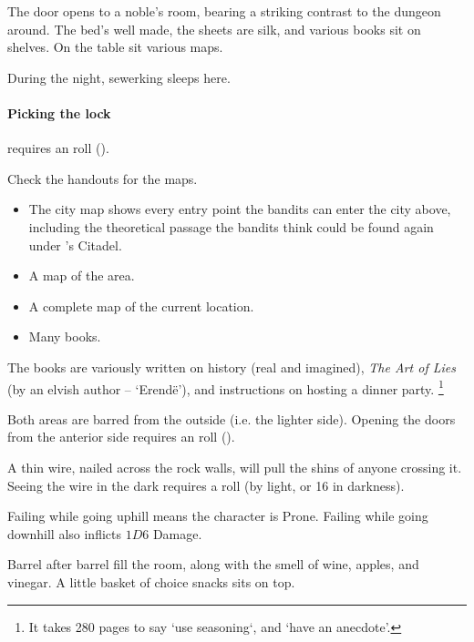 \begin{boxtext}
  The door opens to a noble's room, bearing a striking contrast to the dungeon around.  The bed's well made, the sheets are silk, and various books sit on shelves.
  On the table sit various maps.
\end{boxtext}

\label{sewerKingRoom}

During the night, \gls{sewerking} sleeps here.

\paragraph{Picking the lock}
requires an  roll (\tn[9]).

Check the handouts for the maps.

\begin{itemize}
  \item
  The city map shows every entry point the bandits can enter the city above, including the theoretical passage the bandits think could be found again under 's Citadel.
  \item
  A map of the area.
  \item
  A complete map of the current location.
  \item
  Many books.
\end{itemize}

The books are variously written on history (real and imagined), \textit{The Art of Lies} (by an elvish author -- `Erend\"e'), and instructions on hosting a dinner party.%
\footnote{It takes 280 pages to say `use seasoning`, and `have an anecdote'.}


Both areas are barred from the outside (i.e. the lighter side).
Opening the doors from the anterior side requires an  roll (\tn[10]).

A thin wire, nailed across the rock walls, will pull the shins of anyone crossing it.
Seeing the wire in the dark requires a  roll (\tn[12] by light, or 16 in darkness).

Failing while going uphill means the character is Prone.%
Failing while going downhill also inflicts $1D6$ Damage.

\begin{boxtext}

  Barrel after barrel fill the room, along with the smell of wine, apples, and vinegar.
  A little basket of choice snacks sits on top.

\end{boxtext}

